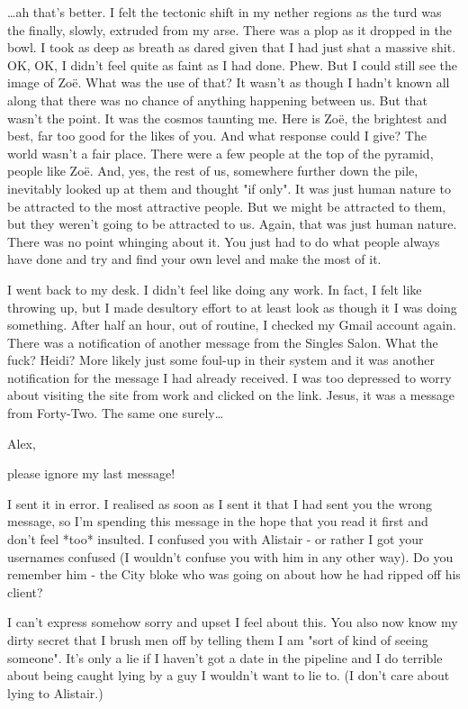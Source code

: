 {\dots}ah that's better. I felt the tectonic shift in my nether
regions as the turd was the finally, slowly, extruded from my arse.
There was a plop as it dropped in the bowl. I took as deep as breath
as dared given that I had just shat a massive shit. OK, OK, I didn't
feel quite as faint as I had done. Phew. But I could still see the
image of Zoë. What was the use of that? It wasn't as though I
hadn't known all along that there was no chance of anything
happening between us. But that wasn't the point. It was the cosmos
taunting me. Here is Zoë, the brightest and best, far too good
for the likes of {\twelveit you}. And what response could I give?
The world wasn't a fair place. There were a few people at the top of
the pyramid, people like Zoë. And, yes, the rest of us,
somewhere further down the pile, inevitably looked up at them and
thought "if only". It was just human nature to be attracted to the
most attractive people. But we might be attracted to them, but they
weren't going to be attracted to us. Again, that was just human
nature. There was no point whinging about it. You just had to do
what people always have done and try and find your own level and
make the most of it.

I went back to my desk. I didn't feel like doing any work. In fact,
I felt like throwing up, but I made desultory effort to at least
look as though it I was doing something. After half an hour, out of
routine, I checked my Gmail account again. There was a notification
of another message from the Singles Salon. What the fuck? Heidi?
More likely just some foul-up in their system and it was another
notification for the message I had already received. I was too
depressed to worry about visiting the site from work and clicked on
the link. Jesus, it was a message from Forty-Two. The same one
surely\dots

\startmessage
Alex,

please ignore my last message!

I sent it in error. I realised as soon as I sent it that I had sent
you the wrong message, so I'm spending this message in the hope that
you read it first and don't feel *too* insulted. I confused you with
Alistair - or rather I got your usernames confused (I wouldn't
confuse you with him in any other way). Do you remember him - the
City bloke who was going on about how he had ripped off his client?

I can't express somehow sorry and upset I feel about this. You also
now know my dirty secret that I brush men off by telling them I am
"sort of kind of seeing someone". It's only a lie if I haven't got a
date in the pipeline and I do terrible about being caught lying by a
guy I wouldn't want to lie to. (I don't care about lying to
Alistair.)

